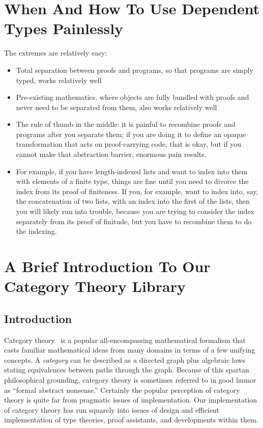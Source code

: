 \section{When And How To Use Dependent Types Painlessly}
The extremes are relatively easy:
\begin{itemize}
    \item Total separation between proofs and programs, so that programs are simply typed, works relatively well
    \item Pre-existing mathematics, where objects are fully bundled with proofs and never need to be separated from them, also works relatively well
    \item The rule of thumb in the middle: it is painful to recombine proofs and programs after you separate them; if you are doing it to define an opaque transformation that acts on proof-carrying code, that is okay, but if you cannot make that abstraction barrier, enormous pain results.
    \item For example, if you have length-indexed lists and want to index into them with elements of a finite type, things are fine until you need to divorce the index from its proof of finiteness.  If you, for example, want to index into, say, the concatenation of two lists, with an index into the first of the lists, then you will likely run into trouble, because you are trying to consider the index separately from its proof of finitude, but you have to recombine them to do the indexing.
\end{itemize}

\section{A Brief Introduction To Our Category Theory Library} \label{sec:category-theory-library}
\subsection{Introduction}
Category theory~\cite{mac1998categories} is a popular all-encompassing mathematical formalism that casts familiar mathematical ideas from many domains in terms of a few unifying concepts.
A \emph{category} can be described as a directed graph plus algebraic laws stating equivalences between paths through the graph.
Because of this spartan philosophical grounding, category theory is sometimes referred to in good humor as ``formal abstract nonsense.''
Certainly the popular perception of category theory is quite far from pragmatic issues of implementation.
Our implementation of category theory has run squarely into issues of design and efficient implementation of type theories, proof assistants, and developments within them.

